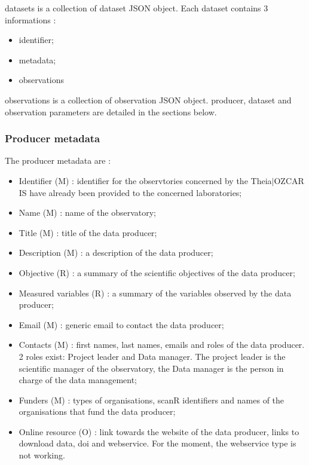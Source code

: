 datasets is a collection of dataset JSON object. Each dataset contains 3 informations : 

\begin{itemize}
\item 	 identifier;
\item 	 metadata;
\item 	 observations
\end{itemize}

observations is a collection of observation JSON object. producer, dataset and observation parameters are detailed in the sections below. 

\subsubsection{Producer metadata}

The producer metadata are : 

\begin{itemize}
\item 	 Identifier (M) : identifier for the observtories concerned by the Theia$\vert$OZCAR IS have already been provided to the concerned laboratories;
\item 	 Name (M) : name of the observatory;
\item 	 Title (M) : title of the data producer;
\item 	 Description (M) : a description of the data producer;
\item 	 Objective (R) : a summary of the scientific objectives of the data producer;
\item 	 Measured variables (R) : a summary of the variables observed by the data producer;
\item 	 Email (M) : generic email to contact the data producer;
\item 	 Contacts (M) : first names, last names, emails and roles of the data producer. 2 roles exist: Project leader and Data manager. The project leader is the scientific manager of the observatory, the Data manager is the person in charge of the data management;
\item 	 Funders (M) : types of organisations, scanR identifiers and names of the organisations that fund the data producer;
\item 	 Online resource (O) : link towards the website of the data producer, links to download data, doi and webservice. For the moment, the webservice type is not working.
\end{itemize}


